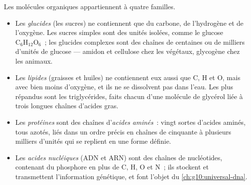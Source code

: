 \begin{definition}\label{def:g10:chemistry-of-life:families}
Les molécules organiques appartiennent à quatre familles.
\begin{itemize}
  \item Les \emph{glucides} (les sucres) ne contiennent
        que du carbone, de l'hydrogène et de l'oxygène. Les sucres
        simples sont des unités isolées, comme le glucose
        $\mathrm{C_6H_{12}O_6}$~; les glucides complexes sont des
        chaînes de centaines ou de milliers d'unités de glucose ---
        amidon et cellulose chez les végétaux, glycogène chez les
        animaux.
  \item Les \emph{lipides} (graisses et huiles) ne
        contiennent eux aussi que C, H et O, mais avec bien moins
        d'oxygène, et ils ne se dissolvent pas dans l'eau. Les plus
        répandus sont les triglycérides, faits chacun d'une molécule de
        glycérol liée à trois longues chaînes d'acides gras.
  \item Les \emph{protéines} sont des chaînes
        d'\emph{acides aminés}~: vingt sortes
        d'acides aminés, tous azotés, liés dans un ordre précis en
        chaînes de cinquante à plusieurs milliers d'unités qui se
        replient en une forme définie.
  \item Les \emph{acides nucléiques} (ADN et
        ARN) sont des chaînes de nucléotides, contenant du phosphore en
        plus de C, H, O et N~; ils stockent et transmettent
        l'information génétique, et font l'objet du
        \cref{ch:g10:universal-dna}.
\end{itemize}
\end{definition}

